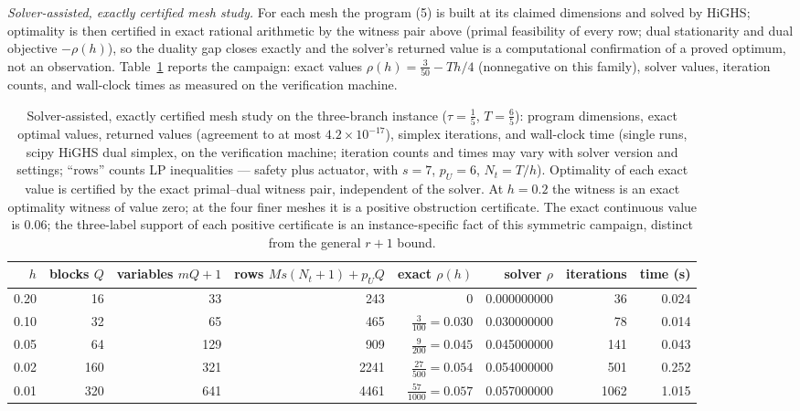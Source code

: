 \documentclass[10pt,twocolumn]{article}
\theoremstyle{plain}
\theoremstyle{definition}
\theoremstyle{remark}
\begin{document}
\emph{Solver-assisted, exactly certified mesh study.} For each mesh the
program (5) is built
at its claimed dimensions and solved by HiGHS; optimality is then certified
in exact rational arithmetic by the witness pair above (primal feasibility of
every row; dual stationarity and dual objective \(-\rho(h)\)), so the duality
gap closes exactly and the solver's returned value is a computational
confirmation of a proved optimum, not an observation.
Table~\ref{tab:mesh} reports the campaign: exact values
\(\rho(h) = \tfrac{3}{50} - Th/4\) (nonnegative on this family), solver values, iteration
counts, and wall-clock times as measured on the verification machine.

\begin{table}[t]
\centering
\footnotesize
\begin{tabular}{@{}r|r|r|r|r|r|r|r@{}}
\toprule
\(h\) & blocks \(Q\) & variables \(mQ{+}1\) & rows \(Ms(N_t{+}1)+p_UQ\) & exact \(\rho(h)\) & solver \(\rho\) & iterations & time (s) \\
\midrule
0.20 & 16 & 33  & 243  & \(0\) & 0.000000000 & 36   & 0.024 \\
0.10 & 32 & 65  & 465  & \(\tfrac{3}{100} = 0.030\) & 0.030000000 & 78   & 0.014 \\
0.05 & 64 & 129 & 909  & \(\tfrac{9}{200} = 0.045\) & 0.045000000 & 141  & 0.043 \\
0.02 & 160 & 321 & 2241 & \(\tfrac{27}{500} = 0.054\) & 0.054000000 & 501  & 0.252 \\
0.01 & 320 & 641 & 4461 & \(\tfrac{57}{1000} = 0.057\) & 0.057000000 & 1062 & 1.015 \\
\bottomrule
\end{tabular}
\caption{Solver-assisted, exactly certified mesh study on the three-branch
instance (\(\tau = \tfrac15\), \(T = \tfrac65\)): program dimensions,
exact optimal values, returned values (agreement to at most
\(4.2 \times 10^{-17}\)), simplex iterations, and wall-clock time (single
runs, scipy HiGHS dual simplex, on the verification machine; iteration
counts and times may vary with solver version and settings; ``rows'' counts
LP inequalities --- safety plus actuator, with \(s = 7\), \(p_U = 6\),
\(N_t = T/h\)). Optimality of each exact value is certified by the exact
primal--dual witness pair, independent of the solver. At \(h = 0.2\) the
witness is an exact optimality witness of value zero; at the four finer
meshes it is a positive obstruction certificate. The exact continuous value
is \(0.06\); the three-label support of each positive certificate is an
instance-specific fact of this symmetric campaign, distinct from the
general \(r + 1\) bound.}
\label{tab:mesh}
\end{table}
\end{document}
